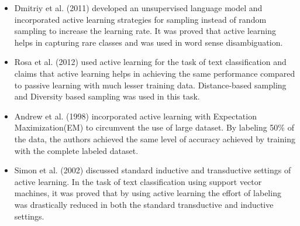 \begin{itemize}
  \item Dmitriy et al. (2011) \cite{dligach2011} developed an unsupervised language model and incorporated active learning strategies for sampling instead of random sampling to increase the learning rate. It was proved that active learning helps in capturing rare classes and was used in word sense disambiguation.
  
  \item Rosa et al. (2012) \cite{figueroa2012} used active learning for the task of text classification and claims that active learning helps in achieving the same performance compared to passive learning with much lesser training data. Distance-based sampling and Diversity based sampling was used in this task.
  
  \item Andrew et al. (1998) \cite{mccallumzy1998} incorporated active learning with Expectation Maximization(EM) to circumvent the use of large dataset. By labeling 50\% of the data, the authors achieved the same level of accuracy achieved by training with the complete labeled dataset. 
  
  \item Simon et al. (2002)\cite{tong2001} discussed standard inductive and transductive settings of active learning. In the task of text classification using support vector machines, it was proved that by using active learning the effort of labeling was drastically reduced in both the standard transductive and inductive settings.
\end{itemize}

